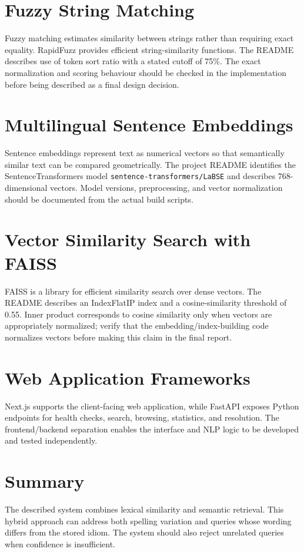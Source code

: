 \documentclass[12pt,a4paper]{report}
\begin{document}
\section{Fuzzy String Matching}
Fuzzy matching estimates similarity between strings rather than requiring exact
equality. RapidFuzz provides efficient string-similarity functions. The README
describes use of token sort ratio with a stated cutoff of 75\%. The exact
normalization and scoring behaviour should be checked in the implementation before
being described as a final design decision.

\section{Multilingual Sentence Embeddings}
Sentence embeddings represent text as numerical vectors so that semantically
similar text can be compared geometrically. The project README identifies the
SentenceTransformers model \texttt{sentence-transformers/LaBSE} and describes
768-dimensional vectors. Model versions, preprocessing, and vector normalization
should be documented from the actual build scripts.

\section{Vector Similarity Search with FAISS}
FAISS is a library for efficient similarity search over dense vectors. The README
describes an IndexFlatIP index and a cosine-similarity threshold of 0.55. Inner
product corresponds to cosine similarity only when vectors are appropriately
normalized; verify that the embedding/index-building code normalizes vectors
before making this claim in the final report.

\section{Web Application Frameworks}
Next.js supports the client-facing web application, while FastAPI exposes Python
endpoints for health checks, search, browsing, statistics, and resolution. The
frontend/backend separation enables the interface and NLP logic to be developed
and tested independently.

\section{Summary}
The described system combines lexical similarity and semantic retrieval. This
hybrid approach can address both spelling variation and queries whose wording
differs from the stored idiom. The system should also reject unrelated queries
when confidence is insufficient.
\end{document}

